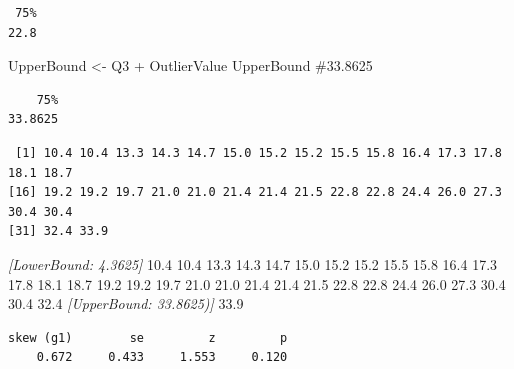 \documentclass[
  letterpaper,
  DIV=11,
  numbers=noendperiod]{scrreprt}
\newenvironment{Shaded}{\begin{snugshade}}{\end{snugshade}}
\newcommand{\CommentTok}[1]{\textcolor[rgb]{0.37,0.37,0.37}{#1}}
\newcommand{\FunctionTok}[1]{\textcolor[rgb]{0.28,0.35,0.67}{#1}}
\newcommand{\NormalTok}[1]{\textcolor[rgb]{0.00,0.23,0.31}{#1}}
\newcommand{\OtherTok}[1]{\textcolor[rgb]{0.00,0.23,0.31}{#1}}
\newcommand{\SpecialCharTok}[1]{\textcolor[rgb]{0.37,0.37,0.37}{#1}}
\begin{document}
\begin{verbatim}
 75% 
22.8 
\end{verbatim}

\begin{Shaded}
\begin{Highlighting}[]
\NormalTok{UpperBound }\OtherTok{\textless{}{-}}\NormalTok{ Q3 }\SpecialCharTok{+}\NormalTok{ OutlierValue}
\NormalTok{UpperBound  }\CommentTok{\#33.8625 }
\end{Highlighting}
\end{Shaded}

\begin{verbatim}
    75% 
33.8625 
\end{verbatim}

\begin{Shaded}
\end{Shaded}

\begin{verbatim}
 [1] 10.4 10.4 13.3 14.3 14.7 15.0 15.2 15.2 15.5 15.8 16.4 17.3 17.8 18.1 18.7
[16] 19.2 19.2 19.7 21.0 21.0 21.4 21.4 21.5 22.8 22.8 24.4 26.0 27.3 30.4 30.4
[31] 32.4 33.9
\end{verbatim}

\emph{{[}LowerBound: 4.3625{]}} 10.4 10.4 13.3 14.3 14.7 15.0 15.2 15.2
15.5 15.8 16.4 17.3 17.8 18.1 18.7 19.2 19.2 19.7 21.0 21.0 21.4 21.4
21.5 22.8 22.8 24.4 26.0 27.3 30.4 30.4 32.4 \emph{{[}UpperBound:
33.8625){]}} 33.9

\begin{Shaded}
\end{Shaded}

\begin{verbatim}
skew (g1)        se         z         p 
    0.672     0.433     1.553     0.120 
\end{verbatim}

\begin{Shaded}
\end{Shaded}
\end{document}
